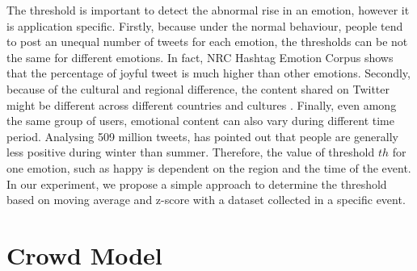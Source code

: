 The threshold is important to detect the abnormal rise in an emotion, however it is application specific. Firstly, because under the normal behaviour, people tend to post an unequal number of tweets for each emotion, the thresholds can be not the same for different emotions. In fact, NRC Hashtag Emotion Corpus \citep{mohammad2014using} shows that the percentage of joyful tweet is much higher than other emotions. Secondly, because of the cultural and regional difference, the content shared on Twitter might be different across different countries and cultures \citep{Larsen2015}. Finally, even among the same group of users, emotional content can also vary during different time period. Analysing 509 million tweets, \citet{Golder30092011} has pointed out that people are generally less positive during winter than summer. Therefore, the value of threshold \(th\) for one emotion, such as happy is dependent on the region and the time of the event. In our experiment, we propose a simple approach to determine the threshold based on moving average and z-score with a dataset collected in a specific event.

\section{Crowd Model}

